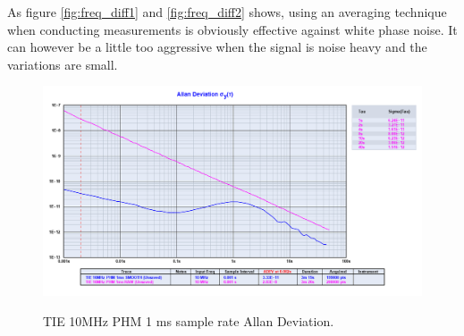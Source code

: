 \documentclass[11pt,english,a4paper]{article}
\begin{document}
\begin{figure}[!htb]
  \centering
  \hfill
\end{figure}
As figure \ref{fig:freq_diff1} and \ref{fig:freq_diff2} shows, using an averaging technique when conducting measurements is obviously effective against white phase noise. It can however be a little too aggressive when the signal is noise heavy and the variations are small. 

\begin{figure}[!htb]
  \centering
    \includegraphics[width=1\textwidth]{tie_10mhz_phm_1ms_allan.png}
    \label{fig:PHM_10MHz_allan_dev}
    \caption{TIE 10MHz PHM 1 ms sample rate Allan Deviation.}
\end{figure}
\end{document}
